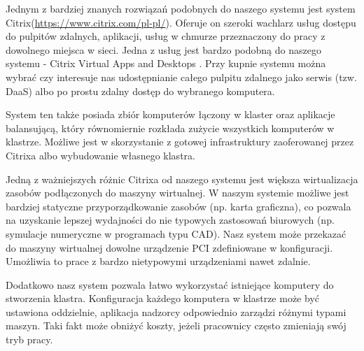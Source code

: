 \documentclass[../wstep.tex]{subfiles}
\begin{document}
	
Jednym z bardziej znanych rozwiązań podobnych do naszego systemu jest system Citrix(\url{https://www.citrix.com/pl-pl/}).
Oferuje on szeroki wachlarz usług dostępu do pulpitów zdalnych, aplikacji, usług w chmurze przeznaczony do pracy z dowolnego miejsca w sieci.
Jedna z usług jest bardzo podobną do naszego systemu - Citrix Virtual Apps and Desktops \parencite{citrix-daas}.
Przy kupnie systemu można wybrać czy interesuje nas udostępnianie całego pulpitu zdalnego jako serwis (tzw. DaaS) albo po prostu zdalny dostęp do wybranego komputera.

System ten także posiada zbiór komputerów łączony w klaster oraz aplikacje balansującą, który równomiernie rozkłada zużycie wszystkich komputerów w klastrze.
Możliwe jest w skorzystanie z gotowej infrastruktury zaoferowanej przez Citrixa albo wybudowanie własnego klastra. 

Jedną z ważniejszych różnic Citrixa od naszego systemu jest większa wirtualizacja zasobów podłączonych do maszyny wirtualnej.
W naszym systemie możliwe jest bardziej statyczne przyporządkowanie zasobów (np. karta graficzna), co pozwala na uzyskanie lepszej wydajności do nie typowych zastosowań biurowych (np. symulacje numeryczne w programach typu CAD).
Nasz system może przekazać do maszyny wirtualnej dowolne urządzenie PCI zdefiniowane w konfiguracji.
Umożliwia to prace z bardzo nietypowymi urządzeniami nawet zdalnie.

Dodatkowo nasz system pozwala łatwo wykorzystać istniejące komputery do stworzenia klastra.
Konfiguracja każdego komputera w klastrze może być ustawiona oddzielnie, aplikacja nadzorcy odpowiednio zarządzi różnymi typami maszyn.
Taki fakt może obniżyć koszty, jeżeli pracownicy często zmieniają swój tryb pracy.
	
\end{document}
